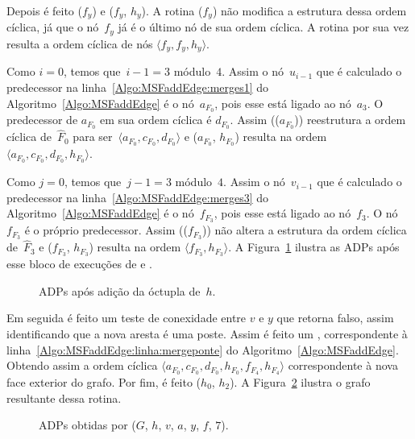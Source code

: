Depois é feito \LCOCycle($f_y$) e \LCOMerge($f_y$, $h_y$).
A rotina \LCOCycle($f_y$) não modifica a estrutura dessa ordem cíclica, já que o nó~$f_y$ já é o último nó de sua ordem cíclica.
A rotina  por sua vez resulta a ordem cíclica de nós $\langle f_y, f_y, h_y \rangle$.

Como $i=0$, temos que~$i-1 = 3$ módulo~$4$.
Assim o nó~$u_{i-1}$ que é calculado o predecessor na linha~\ref{Algo:MSFaddEdge:merges1} do Algoritmo~\ref{Algo:MSFaddEdge} é o nó~$a_{F_0}$, pois esse está ligado ao nó~$a_3$.
O predecessor de $a_{F_0}$ em sua ordem cíclica é $d_{F_0}$.
Assim \LCOCycle(\treapPredecessor($a_{F_0}$)) reestrutura a ordem cíclica de~$\hat F_0$ para ser~$\langle a_{F_0}, c_{F_0}, d_{F_0}\rangle$ e \LCOMerge($a_{F_0}$, $h_{F_0}$) resulta na ordem $\langle a_{F_0}, c_{F_0}, d_{F_0}, h_{F_0}\rangle$.

Como $j=0$, temos que~$j-1 = 3$ módulo~$4$.
Assim o nó~$v_{i-1}$ que é calculado o predecessor na linha~\ref{Algo:MSFaddEdge:merges3} do Algoritmo~\ref{Algo:MSFaddEdge} é o nó~$f_{F_3}$, pois esse está ligado ao nó~$f_3$.
O nó $f_{F_3}$ é o próprio predecessor.
Assim \LCOCycle(\treapPredecessor($f_{F_3}$)) não altera a estrutura da ordem cíclica de~$\hat F_3$ e \LCOMerge($f_{F_3}$, $h_{F_3}$) resulta na ordem $\langle  f_{F_3}, h_{F_3}\rangle$.
A Figura~\ref{fig:MSF-adiciona-ponte-2} ilustra as ADPs após esse bloco de execuções de \LCOCycle{} e \LCOMerge.

\begin{figure}[htb]
\scalebox{1}{

	}
\caption{ADPs após adição da óctupla de~$h$.}
\label{fig:MSF-adiciona-ponte-2}
\end{figure}

Em seguida é feito um teste de conexidade entre $v$ e $y$ que retorna falso, assim identificando que a nova aresta é uma poste.
Assim é feito um , correspondente à linha~\ref{Algo:MSFaddEdge:linha:mergeponte} do Algoritmo~\ref{Algo:MSFaddEdge}.
Obtendo assim a ordem cíclica $\langle a_{F_0}, c_{F_0}, d_{F_0}, h_{F_0}, f_{F_4}, h_{F_4}\rangle$ correspondente à nova face exterior do grafo.
Por fim, é feito \LCOMerge($h_0$, $h_2$).
A Figura~\ref{fig:MSF-adiciona-ponte-3} ilustra o grafo resultante dessa rotina.


\begin{figure}[htb]
\scalebox{1}{

}
\caption{ADPs obtidas por \MSFaddEdge($G$, $h$, $v$, $a$, $y$, $f$, $7$).}
\label{fig:MSF-adiciona-ponte-3}
\end{figure}


